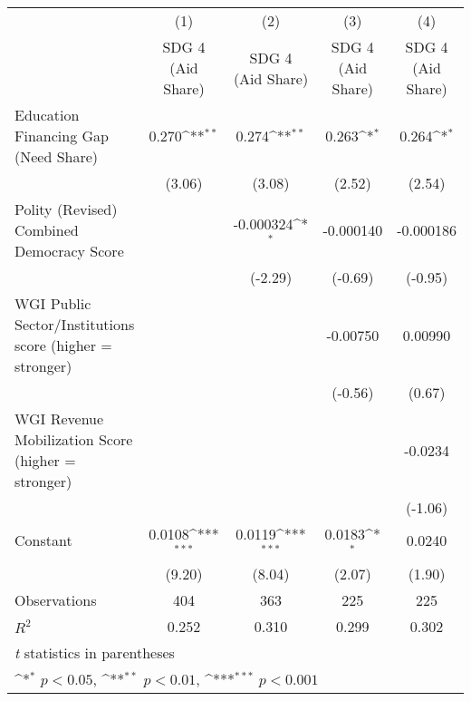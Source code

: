 {
\def\sym#1{\ifmmode^{#1}\else\(^{#1}\)\fi}
\begin{tabular}{l*{4}{c}}
\hline\hline
                &\multicolumn{1}{c}{(1)}&\multicolumn{1}{c}{(2)}&\multicolumn{1}{c}{(3)}&\multicolumn{1}{c}{(4)}\\
                &\multicolumn{1}{c}{SDG 4 (Aid Share)}&\multicolumn{1}{c}{SDG 4 (Aid Share)}&\multicolumn{1}{c}{SDG 4 (Aid Share)}&\multicolumn{1}{c}{SDG 4 (Aid Share)}\\
\hline
Education Financing Gap (Need Share)&    0.270\sym{**} &    0.274\sym{**} &    0.263\sym{*}  &    0.264\sym{*}  \\
                &   (3.06)         &   (3.08)         &   (2.52)         &   (2.54)         \\
[1em]
Polity (Revised) Combined Democracy Score&                  &-0.000324\sym{*}  &-0.000140         &-0.000186         \\
                &                  &  (-2.29)         &  (-0.69)         &  (-0.95)         \\
[1em]
WGI Public Sector/Institutions score (higher = stronger)&                  &                  & -0.00750         &  0.00990         \\
                &                  &                  &  (-0.56)         &   (0.67)         \\
[1em]
WGI Revenue Mobilization Score (higher = stronger)&                  &                  &                  &  -0.0234         \\
                &                  &                  &                  &  (-1.06)         \\
[1em]
Constant        &   0.0108\sym{***}&   0.0119\sym{***}&   0.0183\sym{*}  &   0.0240         \\
                &   (9.20)         &   (8.04)         &   (2.07)         &   (1.90)         \\
\hline
Observations    &      404         &      363         &      225         &      225         \\
\(R^{2}\)       &    0.252         &    0.310         &    0.299         &    0.302         \\
\hline\hline
\multicolumn{5}{l}{\footnotesize \textit{t} statistics in parentheses}\\
\multicolumn{5}{l}{\footnotesize \sym{*} \(p<0.05\), \sym{**} \(p<0.01\), \sym{***} \(p<0.001\)}\\
\end{tabular}
}
